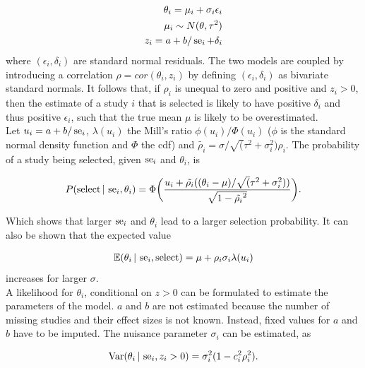 \documentclass[11pt,a4paper,twoside]{book}\usepackage[]{graphicx}\usepackage[]{color}
\begin{document}
\begin{align}
\theta_i = \mu_i + \sigma_i\epsilon_i \nonumber \\ 
\mu_i \sim N(\theta, \tau^2) \nonumber \\
z_i = a + b/\operatorname{se}_i + \delta_i \nonumber
\end{align}
where $(\epsilon_i, \delta_i)$ are standard normal residuals. The two models are coupled by introducing a correlation $\rho = cor(\theta_i, z_i)$ by defining $(\epsilon_i, \delta_i)$ as bivariate standard normals. It follows that,
if $\rho_i$ is unequal to zero and positive and $z_i > 0$, then the estimate of a study $i$ that is selected is likely to have positive $\delta_i$ and thus positive $\epsilon_i$, such that the true mean $\mu$ is likely to be overestimated. \\
Let $u_i = a + b/\operatorname{se}_i$, $\lambda(u_i)$ the Mill's ratio $\phi(u_i)/\Phi(u_i)$ ($\phi$ is the standard normal density function and $\Phi$ the cdf) and $\tilde{\rho_i} = \sigma/\sqrt(\tau^2 + \sigma_i^2) \rho_i$. The probability of a study being selected, given $\operatorname{se}_i$ and $\theta_i$, is

\begin{align}
P(\textrm{select} \given \se_i, \theta_i) = %
\Phi\bigg(\frac{u_i + \tilde{\rho_i}((\theta_i - \mu)/\sqrt(\tau^2 + \sigma_i^2))}{\sqrt{1 - \tilde{\rho_i}^2}}\bigg). \nonumber
\end{align}

Which shows that larger $\operatorname{se}_i$ and $\theta_i$ lead to a larger selection probability. It can also be shown that the expected value 

\begin{align}
\mathbb{E}(\theta_i \,\vert\, \operatorname{se}_i, \textrm{select}) = \mu + \rho_i\sigma_i\lambda(u_i) \label{eq:copas.expectation}
\end{align}
increases for larger $\sigma$.\\
A likelihood for $\theta_i$, conditional on $z>0$ can be formulated to estimate the parameters of the model. $a$ and $b$ are not estimated because the number of missing studies and their effect sizes is not known. Instead, fixed values for $a$ and $b$ have to be imputed.
The nuisance parameter $\sigma_i$ can be estimated, as

\begin{align}
\textrm{Var}(\theta_i\,\vert\, \operatorname{se}_i, z_i > 0) = \sigma_i^2 (1 - c_i^2\rho_i^2). \nonumber
\end{align}
\end{document}
